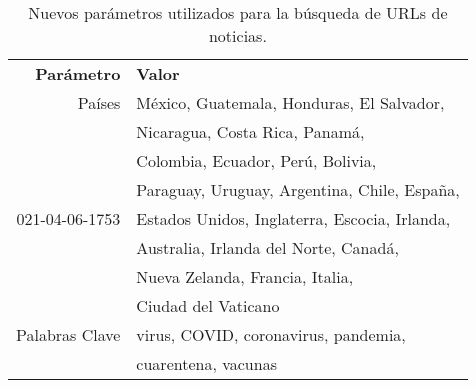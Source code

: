 \begin{table}[h]
    \centering
    \begin{tabular}{r|l}
        \textbf{Parámetro} & \textbf{Valor} \\
        Países  & México, Guatemala, Honduras, El Salvador, \\
                & Nicaragua, Costa Rica, Panamá, \\
                & Colombia, Ecuador, Perú, Bolivia, \\
                & Paraguay, Uruguay, Argentina, Chile, España, \\021-04-06-1753
                & Estados Unidos, Inglaterra, Escocia, Irlanda, \\
                & Australia, Irlanda del Norte, Canadá, \\
                & Nueva Zelanda, Francia, Italia, \\
                & Ciudad del Vaticano \\
        Palabras Clave & virus, COVID, coronavirus, pandemia, \\
                & cuarentena, vacunas \\
    \end{tabular}
    \caption{Nuevos parámetros utilizados para la búsqueda de URLs de noticias.}
    \label{tab:news_final_parameters}
\end{table}